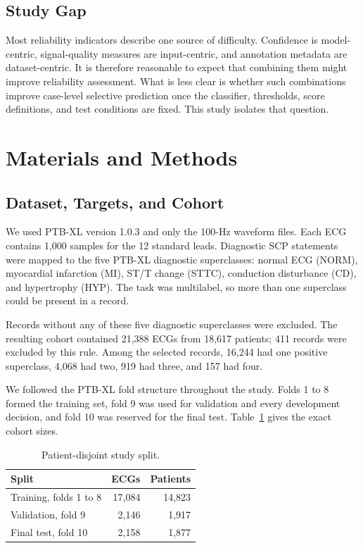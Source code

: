 \documentclass[journal]{IEEEtran}
\newcommand{\NSelected}{21,388}
\newcommand{\PSelected}{18,617}
\newcommand{\NExcluded}{411}
\newcommand{\NTrain}{17,084}
\newcommand{\PTrain}{14,823}
\newcommand{\NVal}{2,146}
\newcommand{\PVal}{1,917}
\newcommand{\NTest}{2,158}
\newcommand{\PTest}{1,877}
\begin{document}
\subsection{Study Gap}
Most reliability indicators describe one source of difficulty. Confidence is model-centric, signal-quality measures are input-centric, and annotation metadata are dataset-centric. It is therefore reasonable to expect that combining them might improve reliability assessment. What is less clear is whether such combinations improve case-level selective prediction once the classifier, thresholds, score definitions, and test conditions are fixed. This study isolates that question.

\section{Materials and Methods}
\subsection{Dataset, Targets, and Cohort}
We used PTB-XL version 1.0.3 and only the 100-Hz waveform files. Each ECG contains 1,000 samples for the 12 standard leads. Diagnostic SCP statements were mapped to the five PTB-XL diagnostic superclasses: normal ECG (NORM), myocardial infarction (MI), ST/T change (STTC), conduction disturbance (CD), and hypertrophy (HYP). The task was multilabel, so more than one superclass could be present in a record.

Records without any of these five diagnostic superclasses were excluded. The resulting cohort contained \NSelected{} ECGs from \PSelected{} patients; \NExcluded{} records were excluded by this rule. Among the selected records, 16,244 had one positive superclass, 4,068 had two, 919 had three, and 157 had four.

We followed the PTB-XL fold structure throughout the study. Folds 1 to 8 formed the training set, fold 9 was used for validation and every development decision, and fold 10 was reserved for the final test. Table~\ref{tab:split} gives the exact cohort sizes.

\begin{table}[t]
\centering
\caption{Patient-disjoint study split.}
\label{tab:split}
\begin{tabular}{lrr}
\toprule
Split & ECGs & Patients \\
\midrule
Training, folds 1 to 8 & \NTrain{} & \PTrain{} \\
Validation, fold 9 & \NVal{} & \PVal{} \\
Final test, fold 10 & \NTest{} & \PTest{} \\
\bottomrule
\end{tabular}
\end{table}
\end{document}
